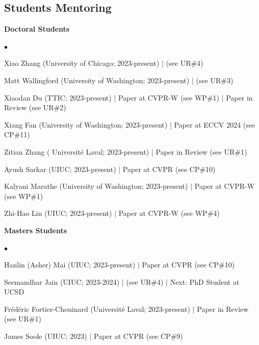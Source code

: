 \documentclass[margin,line]{res}
\newenvironment{list2}{
  \begin{list}{$\bullet$}{%
      \setlength{\itemsep}{0in}
      \setlength{\parsep}{0in} \setlength{\parskip}{0in}
      \setlength{\topsep}{0in} \setlength{\partopsep}{0in} 
      \setlength{\leftmargin}{0.2in}}}{\end{list}}
\begin{document}
\begin{resume}
\section{\sc \large Students Mentoring}
{\bf Doctoral Students}\\\vspace*{-0.15in}
\begin{list2}
\item Xiao Zhang (University of Chicago; 2023-present) $|$ (see UR\#4)
\item Matt Wallingford (University of Washington; 2023-present) $|$ (see UR\#3)
\item Xiaodan Du (TTIC; 2023-present) $|$  Paper at CVPR-W (see WP\#1) $|$ Paper in Review (see UR\#2)
\item Xiang Fan (University of Washington; 2023-present) $|$ Paper at ECCV 2024 (see CP\#11)
\item Zitian Zhang ( Universit\'e Laval; 2023-present) $|$ Paper in Review (see UR\#1)
\item Ayush Sarkar (UIUC; 2023-present) $|$ Paper at CVPR (see CP\#10)
\item Kalyani Marathe (University of Washington; 2023-present) $|$ Paper at CVPR-W (see WP\#1)
\item Zhi-Hao Lin (UIUC; 2023-present) $|$ Paper at CVPR-W (see WP\#4)
\end{list2}
{\bf Masters Students}\\\vspace*{-0.15in}
\begin{list2}
\item Hanlin (Asher) Mai (UIUC; 2023-present) $|$ Paper at CVPR (see CP\#10)
\item Seemandhar Jain (UIUC; 2023-2024) $|$ (see UR\#4) $|$ Next: PhD Student at UCSD
\item Fr\'ed\'eric Fortier-Chouinard
 (Universit\'e Laval; 2023-present) $|$ Paper in Review (see UR\#1)
\item James Soole (UIUC; 2023) $|$ Paper at CVPR (see CP\#9)


\end{list2}
\end{resume}
\end{document}
